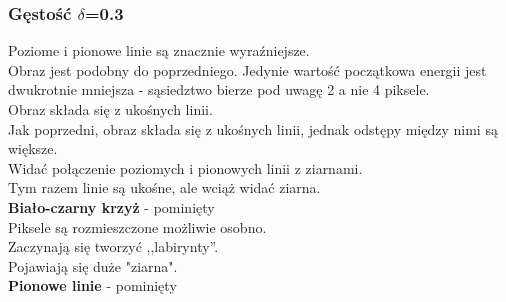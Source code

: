 \subsubsection{Gęstość $\delta$=0.3}
Poziome i pionowe linie są znacznie wyraźniejsze.\\
Obraz jest podobny do poprzedniego. Jedynie wartość początkowa energii jest dwukrotnie mniejsza - sąsiedztwo bierze pod uwagę 2 a nie 4 piksele.\\
Obraz składa się z ukośnych linii.\\
Jak poprzedni, obraz składa się z ukośnych linii, jednak odstępy między nimi są większe.\\
Widać połączenie poziomych i pionowych linii z ziarnami.\\
Tym razem linie są ukośne, ale wciąż widać ziarna.\\
\textbf{Biało-czarny krzyż} - pominięty\\
Piksele są rozmieszczone możliwie osobno.\\
Zaczynają się tworzyć ,,labirynty''.\\
Pojawiają się duże "ziarna".\\
\textbf{Pionowe linie} - pominięty\\


